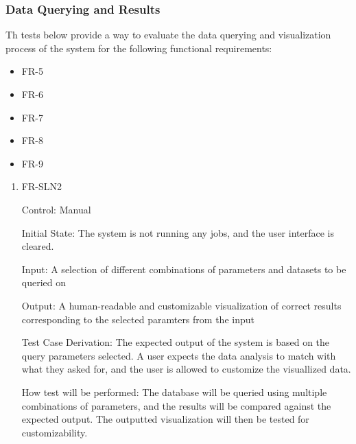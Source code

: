 \documentclass[12pt, titlepage]{article}
\begin{document}
\subsubsection{Data Querying and Results}
Th tests below provide a way to evaluate the data querying and visualization process of the system for the following functional requirements:
\begin{itemize}
  \item FR-5
  \item FR-6
  \item FR-7
  \item FR-8
  \item FR-9
\end{itemize}
\begin{enumerate}

  \item{FR-SLN2}
  
  Control: Manual
            
  Initial State: The system is not running any jobs, and the user interface is cleared. 
            
  Input: A selection of different combinations of parameters and datasets to be queried on
            
  Output: A human-readable and customizable visualization of correct results corresponding to the selected paramters from the input
  
  Test Case Derivation: The expected output of the system is based on the query parameters selected. A user expects the data analysis to match with what they asked for, and the user is allowed to customize the visuallized data.
            
  How test will be performed: The database will be queried using multiple combinations of parameters, and the results will be compared against the expected output. The outputted visualization will then be tested for customizability.
  
  \end{enumerate}
\end{document}
